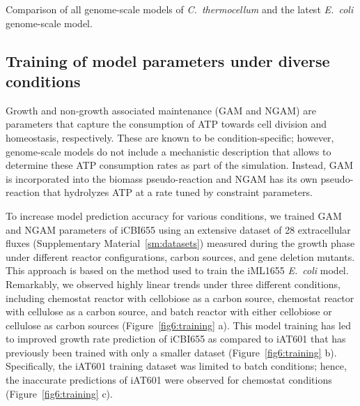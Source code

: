 \begin{table}[h]
    \caption[Comparison of all genome-scale models of \textit{C.~thermocellum}]{Comparison of all genome-scale models of \textit{C.~thermocellum} and the latest \textit{E.~coli} genome-scale model.}
    \centering
    
    \label{tab6:models}
\end{table}


\subsection{Training of model parameters under diverse conditions}

Growth and non-growth associated maintenance (GAM and NGAM) are parameters that capture the consumption of ATP towards cell division and homeostasis, respectively. These are known to be condition-specific; however, genome-scale models do not include a mechanistic description that allows to determine these ATP consumption rates as part of the simulation. Instead, GAM is incorporated into the biomass pseudo-reaction and NGAM has its own pseudo-reaction that hydrolyzes ATP at a rate tuned by constraint parameters.

To increase model prediction accuracy for various conditions, we trained GAM and NGAM parameters of iCBI655 using an extensive dataset of 28 extracellular fluxes (Supplementary Material~\ref{sm:datasets}) measured during the
growth phase under different reactor configurations, carbon sources, and gene deletion mutants. This approach is based on the method used to train the iML1655 \textit{E.~coli} model.\citep{monk2017}
Remarkably, we observed highly linear trends under three different conditions, including chemostat reactor with cellobiose as a carbon source, chemostat reactor with cellulose as a carbon source, and batch reactor with either cellobiose or cellulose as carbon sources (Figure~\ref{fig6:training} a). This model training has led to improved growth rate prediction of iCBI655 as compared to iAT601 that has previously been trained with only a smaller dataset (Figure~\ref{fig6:training} b). Specifically, the iAT601 training dataset was limited to batch conditions; hence, the inaccurate predictions of iAT601 were observed for chemostat conditions (Figure~\ref{fig6:training} c).

